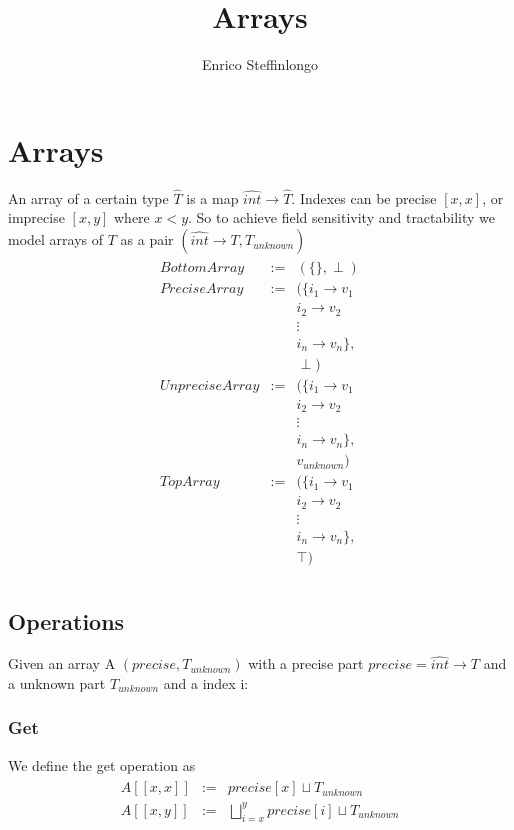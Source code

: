 \documentclass[10pt,a4paper,final]{article}
\author{Enrico Steffinlongo}
\title{Arrays}
\begin{document}
\maketitle
\section{Arrays}
An array of a certain type $\widehat{T}$ is a map $\widehat{int} \rightarrow \widehat{T}$. Indexes can be precise $[x,x]$, or imprecise $[x,y]$ where $x < y$. So to achieve field sensitivity and tractability we model arrays of $T$ as a pair $(\widehat{int} \rightarrow T, T_{unknown})$
\begin{align}
\begin{array}{rcl}
BottomArray &:=& (\{\}, \perp )\\
PreciseArray &:=& (\{ i_1 \rightarrow v_1 \\
&& i_2 \rightarrow v_2\\
&& \vdots\\
&& i_n \rightarrow v_n\},\\
&& \perp)\\
UnpreciseArray &:=& (\{ i_1 \rightarrow v_1 \\
&& i_2 \rightarrow v_2\\
&& \vdots\\
&& i_n \rightarrow v_n\},\\
&& v_{unknown})\\
TopArray &:=& (\{ i_1 \rightarrow v_1 \\
&& i_2 \rightarrow v_2\\
&& \vdots\\
&& i_n \rightarrow v_n\},\\
&& \top)\\
\end{array}
\end{align}

\subsection{Operations}
Given an array A $(precise, T_{unknown})$ with a precise part $precise = \widehat{int} \rightarrow T$ and a unknown part $T_{unknown}$ and a index i:
\subsubsection{Get}
We define the get operation as
\begin{align}
\begin{array}{rcl}
A[[x,x]] &:=& precise[x] \sqcup T_{unknown} \\
A[[x,y]] &:=& \bigsqcup_{i=x}^{y}precise[i] \sqcup T_{unknown} \\
\end{array}
\end{align}
\end{document}
